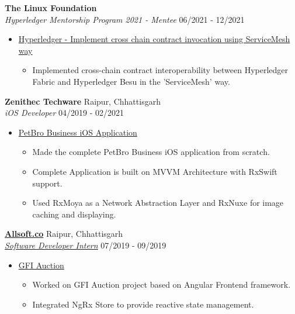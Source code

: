 \documentclass{article}
\begin{document}
\noindent \normalsize \textbf{The Linux Foundation} \\
\textit{Hyperledger Mentorship Program 2021 - Mentee} \hfill 06/2021 - 12/2021
\begin{itemize}[noitemsep,nolistsep,leftmargin=*]
    \item {\normalsize \href{https://wiki.hyperledger.org/display/INTERN/Implement+cross+chain+contract+invocation+using+ServiceMesh+way}{Hyperledger - Implement cross chain contract invocation using ServiceMesh way}
        \begin{itemize}
            \item  Implemented cross-chain contract interoperability between Hyperledger Fabric and Hyperledger Besu in the 'ServiceMesh' way.
        \end{itemize}
    }
\end{itemize}

\noindent \normalsize \textbf{Zenithec Techware} \hfill Raipur, Chhattisgarh \\
\textit{iOS Developer} \hfill 04/2019 - 02/2021
\begin{itemize}[noitemsep,nolistsep,leftmargin=*]
    \item {\normalsize \href{https://apple.co/3kAiLJ0}{PetBro Business iOS Application}
        \begin{itemize}
            \item Made the complete PetBro Business iOS application from scratch.
            \item Complete Application is built on MVVM Architecture with RxSwift support.
            \item Used RxMoya as a Network Abstraction Layer and RxNuxe for image caching and displaying.
        \end{itemize}
    }
\end{itemize}

\noindent \normalsize \href{https://bit.ly/allsoft_certificate}{\textbf{Allsoft.co}} \hfill Raipur, Chhattisgarh \\
\noindent \normalsize \textit{\href{https://bit.ly/allsoft_certificate}{Software Developer Intern}} \hfill 07/2019 - 09/2019
\begin{itemize}[noitemsep,nolistsep,leftmargin=*]
    \item {\normalsize \href{https://bit.ly/allsoft_certificate}{GFI Auction}
        \begin{itemize}
            \item Worked on GFI Auction project based on Angular Frontend framework.
            \item Integrated NgRx Store to provide reactive state management.
        \end{itemize}
    }
\end{itemize}
\end{document}
